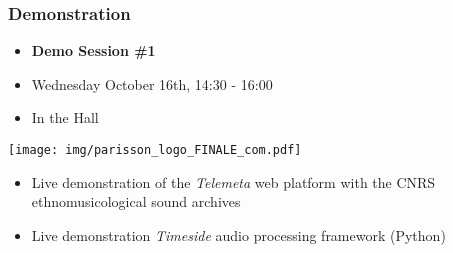 \documentclass[final, hyperref, table]{beamer}
\begin{document}
\begin{frame}
  \frametitle{Demonstration}
 
  \begin{itemize}
  \item \textbf{ Demo Session \#1}
  \item \alert{Wednesday} October 16th, 14:30 - 16:00
  \item In the Hall
  \end{itemize}
 \begin{center}
    \texttt{[image: img/parisson\_logo\_FINALE\_com.pdf]}
  \end{center}

  \begin{itemize}
  \item Live demonstration of the \emph{Telemeta} web platform with the CNRS ethnomusicological sound archives
  \item Live demonstration \emph{Timeside} audio processing framework (Python)
  \end{itemize}
\end{frame}
\end{document}
